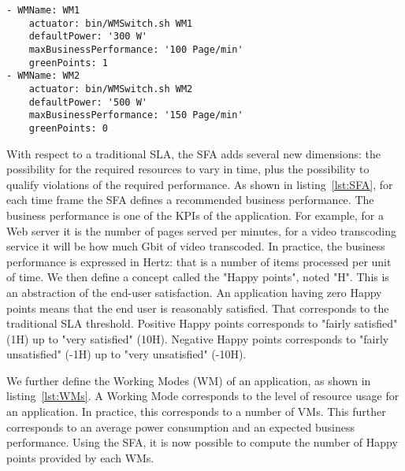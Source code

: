 \begin{lstlisting}[caption={Working Modes definition}, label={lst:WMs}]
- WMName: WM1
    actuator: bin/WMSwitch.sh WM1
    defaultPower: '300 W'
    maxBusinessPerformance: '100 Page/min'
    greenPoints: 1
- WMName: WM2
    actuator: bin/WMSwitch.sh WM2
    defaultPower: '500 W'
    maxBusinessPerformance: '150 Page/min'
    greenPoints: 0
\end{lstlisting}

With respect to a traditional SLA, the SFA adds several new dimensions: the possibility for the required resources to vary in time, plus the possibility to qualify violations of the required performance.
As shown in listing~\ref{lst:SFA}, for each time frame the SFA defines a recommended business performance. 
The business performance is one of the KPIs of the application.
For example, for a Web server it is the number of pages served per minutes, for a video transcoding service it will be how much Gbit of video transcoded.
In practice, the business performance is expressed in Hertz: that is a number of items processed per unit of time.
We then define a concept called the "Happy points", noted "H".
This is an abstraction of the end-user satisfaction.
An application having zero Happy points means that the end user is reasonably satisfied.
That corresponds to the traditional SLA threshold.
Positive Happy points corresponds to "fairly satisfied" (1H) up to "very satisfied" (10H).
Negative Happy points corresponds to "fairly unsatisfied" (-1H) up to "very unsatisfied" (-10H).

We further define the Working Modes (WM) of an application, as shown in listing~\ref{lst:WMs}.
A Working Mode corresponds to the level of resource usage for an application.
In practice, this corresponds to a number of VMs.
This further corresponds to an average power consumption and an expected business performance. 
Using the SFA, it is now possible to compute the number of Happy points provided by each WMs.


